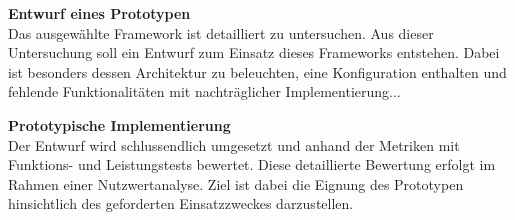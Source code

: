 \textbf{Entwurf eines Prototypen}\\
Das ausgewählte Framework ist detailliert zu untersuchen.
Aus dieser Untersuchung soll ein Entwurf zum Einsatz dieses Frameworks entstehen.
Dabei ist besonders dessen Architektur zu beleuchten, eine Konfiguration enthalten und fehlende Funktionalitäten mit nachträglicher Implementierung...

\textbf{Prototypische Implementierung}\\
Der Entwurf wird schlussendlich umgesetzt und anhand der Metriken mit Funktions- und Leistungstests bewertet.
Diese detaillierte Bewertung erfolgt im Rahmen einer Nutzwertanalyse.
Ziel ist dabei die Eignung des Prototypen hinsichtlich des geforderten Einsatzzweckes darzustellen.